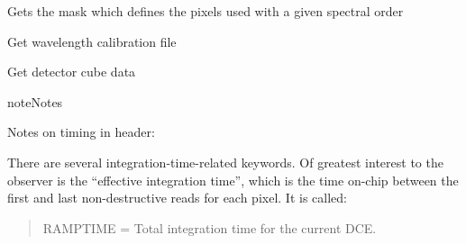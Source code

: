 \documentclass[a4paper,10pt,english]{sphinxmanual}
\begin{document}
\begin{fulllineitems}
\begin{fulllineitems}
\end{fulllineitems}


\begin{fulllineitems}
\label{\detokenize{cascade.instruments:cascade.instruments.instruments.SpitzerIRS._get_order_mask}}
Gets the mask which defines the pixels used with a given spectral order

\end{fulllineitems}


\begin{fulllineitems}
\label{\detokenize{cascade.instruments:cascade.instruments.instruments.SpitzerIRS._get_wavelength_calibration}}
Get wavelength calibration file

\end{fulllineitems}


\begin{fulllineitems}
\label{\detokenize{cascade.instruments:cascade.instruments.instruments.SpitzerIRS.get_detector_cubes}}
Get detector cube data

\begin{sphinxadmonition}{note}{Notes}

Notes on timing in header:

There are several integration-time-related keywords.
Of greatest interest to the observer is the
“effective integration time”, which is the time on-chip between
the first and last non-destructive reads for each pixel. It is called:
\begin{quote}

RAMPTIME = Total integration time for the current DCE.
\end{quote}


\end{sphinxadmonition}
\end{fulllineitems}
\end{fulllineitems}
\end{document}
